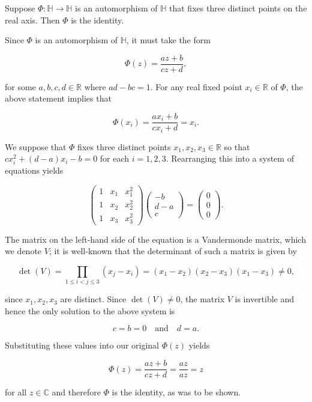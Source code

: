 Suppose $\Phi: \mathbb{H} \to \mathbb{H}$ is an automorphism of $\mathbb{H}$ that fixes three distinct points on the 
real axis. Then $\Phi$ is the identity.


\begin{solution}
  Since $\Phi$ is an automorphism of $\mathbb{H}$, it must take the form

  $$
  \Phi(z) = \frac{az + b}{cz + d},
  $$

  for some $a, b, c, d \in \mathbb{R}$ where $ad - bc = 1$. For any real fixed point $x_i \in \mathbb{R}$ of $\Phi$, the 
  above statement implies that 

  $$
  \Phi(x_i) = \frac{ax_i + b}{cx_i + d} = x_i.
  $$

  We suppose that $\Phi$ fixes three distinct points $x_1, x_2, x_3 \in \mathbb{R}$ so that 
  $cx_i^2 + (d - a)x_i - b = 0$ for each $i = 1, 2, 3$. Rearranging this into a system of equations yields

  $$
  \begin{pmatrix}
  1 & x_1 & x_1^2 \\
  1 & x_2 & x_2^2 \\
  1 & x_3 & x_3^2
  \end{pmatrix} \begin{pmatrix}
    -b \\
    d - a \\
    c
  \end{pmatrix} = \begin{pmatrix}
    0 \\
    0 \\
    0
  \end{pmatrix}.
  $$

  The matrix on the left-hand side of the equation is a Vandermonde matrix, which we denote $V$; it is well-known that 
  the determinant of such a matrix is given by

  $$
  \det(V) = \prod_{1 \le i < j \le 3} (x_j - x_i) = (x_1 - x_2)(x_2 - x_3)(x_1 - x_3) \neq 0,
  $$

  since $x_1, x_2, x_3$ are distinct. Since $\det(V) \neq 0$, the matrix $V$ is invertible and hence the only solution 
  to the above system is

  $$
  c = b = 0 \quad \text{and} \quad d = a.
  $$

  Substituting these values into our original $\Phi(z)$ yields

  $$
  \Phi(z) = \frac{az + b}{cz + d} = \frac{az}{az} = z
  $$

  for all $z \in \mathbb{C}$ and therefore $\Phi$ is the identity, as was to be shown.
  \ \\
\end{solution}